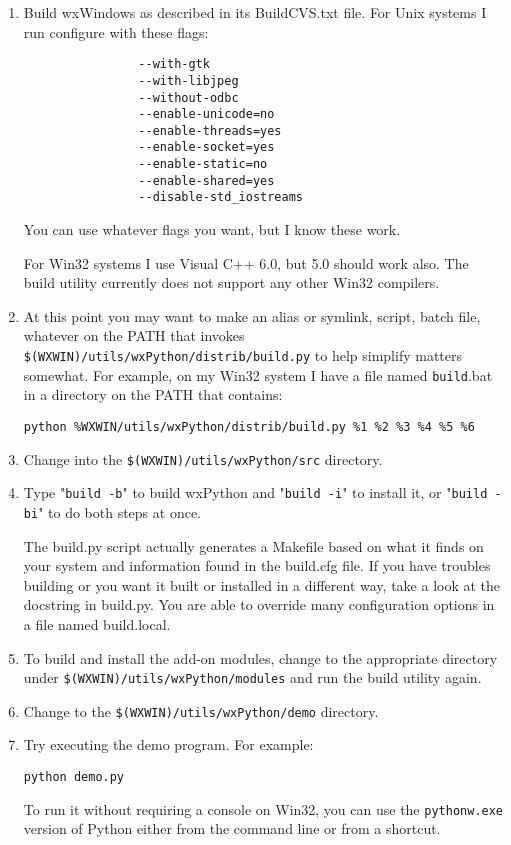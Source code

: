 \begin{enumerate}\itemsep=0pt
\item Build wxWindows as described in its BuildCVS.txt file. For Unix
systems I run configure with these flags:

\begin{verbatim}
                --with-gtk
                --with-libjpeg
                --without-odbc
                --enable-unicode=no
                --enable-threads=yes
                --enable-socket=yes
                --enable-static=no
                --enable-shared=yes
                --disable-std_iostreams
\end{verbatim}

You can use whatever flags you want, but I know these work.

For Win32 systems I use Visual C++ 6.0, but 5.0 should work also. The
build utility currently does not support any other Win32 compilers.
\item At this point you may want to make an alias or symlink, script,
batch file, whatever on the PATH that invokes {\tt \$(WXWIN)/utils/wxPython/distrib/build.py} to
help simplify matters somewhat. For example, on my Win32 system I have a file named
 {\tt build}.bat in a directory on the PATH that contains:

{\tt python \%WXWIN/utils/wxPython/distrib/build.py \%1 \%2 \%3 \%4 \%5 \%6}
\item Change into the {\tt \$(WXWIN)/utils/wxPython/src} directory.
\item Type "{\tt build -b}" to build wxPython and "{\tt build -i}" to
install it, or "{\tt build -bi}" to do both steps at once.

The build.py script actually generates a Makefile based on what it
finds on your system and information found in the build.cfg file.
If you have troubles building or you want it built or installed in
a different way, take a look at the docstring in build.py. You are
able to override many configuration options in a file named
build.local.
\item To build and install the add-on modules, change to the appropriate
directory under {\tt \$(WXWIN)/utils/wxPython/modules} and run the build
utility again.
\item Change to the {\tt \$(WXWIN)/utils/wxPython/demo} directory.
\item Try executing the demo program. For example:

{\tt python demo.py}

To run it without requiring a console on Win32, you can use the
{\tt pythonw.exe} version of Python either from the command line or from a
shortcut.
\end{enumerate}

